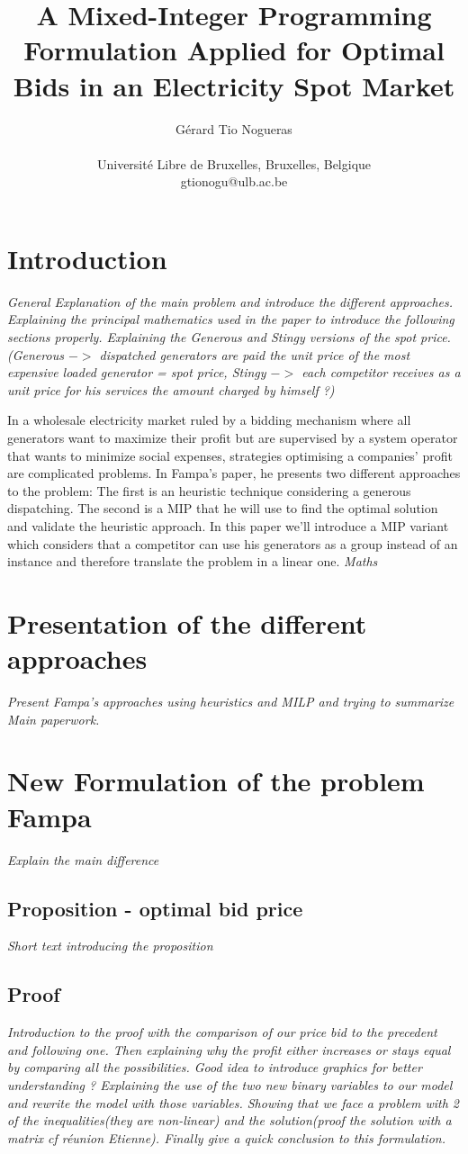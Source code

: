 \documentclass[letterpaper]{article}
\title{A Mixed-Integer Programming Formulation Applied for Optimal Bids in an Electricity Spot Market}
\author{Gérard Tio Nogueras \\
\mbox{}\\
Université Libre de Bruxelles, Bruxelles, Belgique \\
gtionogu@ulb.ac.be}
\begin{document}
\begin{abstract}
\end{abstract}

\section{Introduction}
\textit{General Explanation of the main problem and introduce the different approaches.
Explaining the principal mathematics used in the paper to introduce the following sections properly.
Explaining the Generous and Stingy versions of the spot price.
(Generous $->$ dispatched generators are paid the unit price of the most expensive loaded generator = spot price, Stingy $->$ each competitor receives as a unit price for his services the amount charged by himself ?)}

In a wholesale electricity market ruled by a bidding mechanism where all generators want to maximize their profit but are supervised by a system operator that wants to minimize social expenses, strategies optimising a companies' profit are complicated problems.
In Fampa's paper, he presents two different approaches to the problem: The first is an heuristic technique considering a generous dispatching. The second is a MIP that he will use to find the optimal solution and validate the heuristic approach.
In this paper we'll introduce a MIP variant which considers that a competitor can use his generators as a group instead of an instance and therefore translate the problem in a linear one.
\textit{Maths}

\section{Presentation of the different approaches}
\textit{Present Fampa's approaches using heuristics and MILP and trying to summarize Main paperwork.}

\section{New Formulation of the problem Fampa}
\textit{Explain the main difference}
\subsection{Proposition - optimal bid price}
\textit{Short text introducing the proposition} 
\subsection{Proof}
\textit{Introduction to the proof with the comparison of our price bid to the precedent and following one. Then explaining why the profit either increases or stays equal by comparing all the possibilities. Good idea to introduce graphics for better understanding ? Explaining the use of the two new binary variables to our model and rewrite the model with those variables. Showing that we face a problem with 2 of the inequalities(they are non-linear) and the solution(proof the solution with a matrix cf réunion Etienne). Finally give a quick conclusion to this formulation.}
\end{document}
